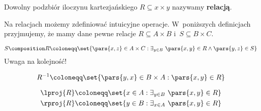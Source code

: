\begin{definition}[Relacja]
Dowolny podzbiór iloczynu kartezjańskiego \(R \subseteq x \times y\) nazywamy \textbf{relacją}.
\end{definition}
Na relacjach możemy zdefiniować intuicyjne operacje. W~poniższych definicjach przyjmujemy, że mamy dane pewne relacje \(R \subseteq A \times B\) i~\(S \subseteq B \times C\).
\begin{definition}
\begin{equation*}
    S \composition R
        \coloneqq \set{\pars{x, z} \in A \times C : \exists_{y \in B} \ \pars{x, y} \in R \land \pars{y, z} \in S}
\end{equation*}
Uwaga na kolejność!
\end{definition}
\begin{definition}
\begin{equation*}
    R^{-1} \coloneqq \set{\pars{y, x} \in B \times A : \pars{x, y} \in R}
\end{equation*}
\end{definition}
\begin{definition}[Projekcje]
\begin{align*}
    \lproj{R} &\coloneqq \set{x \in A : \exists_{y \in B} \ \pars{x, y} \in R}\\
    \rproj{R} &\coloneqq \set{y \in B : \exists_{x \in A} \ \pars{x, y} \in R}\\
\end{align*}
\end{definition}